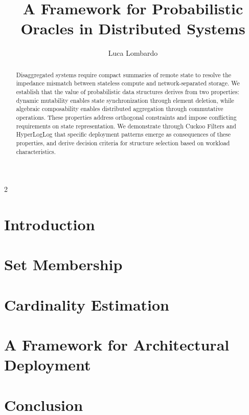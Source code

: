 \documentclass[11pt]{article}
\title{A Framework for Probabilistic Oracles in Distributed Systems}
\author{Luca Lombardo}
\date{}
\theoremstyle{definition}
\theoremstyle{remark}
\begin{document}
\maketitle

\begin{abstract}
    Disaggregated systems require compact summaries of remote state to resolve the impedance mismatch between stateless compute and network-separated storage. We establish that the value of probabilistic data structures derives from two properties: dynamic mutability enables state synchronization through element deletion, while algebraic composability enables distributed aggregation through commutative operations. These properties address orthogonal constraints and impose conflicting requirements on state representation. We demonstrate through Cuckoo Filters and HyperLogLog that specific deployment patterns emerge as consequences of these properties, and derive decision criteria for structure selection based on workload characteristics.
\end{abstract}



\begin{multicols}{2}
    \section{Introduction}
    \label{sec:introduction}
    

    \section{Set Membership}
    \label{sec:membership}
    

    \section{Cardinality Estimation}
    \label{sec:cardinality}
    

    \section{A Framework for Architectural Deployment}
    \label{sec:framework}
    

    \section{Conclusion}
    \label{sec:conclusion}
    

    
    
    \nocite{*}
\end{multicols}
\end{document}
